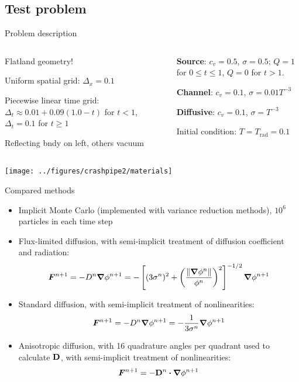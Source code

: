 \documentclass{beamer}
\newcommand{\Dtens}{\mat{D}}
\begin{document}
\subsection{Test problem}
\begin{frame}{Problem description}
  \begin{columns}[t]
    \begin{column}{.48\textwidth}
      Flatland geometry!

      Uniform spatial grid: $\Delta_x=0.1$
      
      Piecewise linear time grid: $\Delta_t \approx 0.01 + 0.09 (1.0 - t)$ for
      $t < 1$, $\Delta_t=0.1$ for $t \ge 1$

      Reflecting bndy on left, others vacuum
    \end{column}
    \begin{column}{.48\textwidth}
      \textcolor[rgb]{0,0,1}{\textbf{Source}}: $c_v=0.5$, $\sigma=0.5$;
      $Q=1$ for $0 \le t \le 1$, $Q=0$ for $t > 1$.

      \textcolor[rgb]{0.1,0.9,0.1}{\textbf{Channel}}: $c_v=0.1$,
      $\sigma=0.01 T^{-3}$

      \textcolor[rgb]{1,0,0}{\textbf{Diffusive}}: $c_v=0.1$,
      $\sigma=T^{-3}$

      Initial condition: $T=T_\text{rad}=0.1$
    \end{column}
  \end{columns}
\begin{center}
  \texttt{[image: ../figures/crashpipe2/materials]}
\end{center}
\end{frame}
\begin{frame}{Compared methods}
\begin{itemize}
  \item Implicit Monte Carlo \cite{Fle1971} (implemented with variance
    reduction methods), $10^6$ particles in each time step
  \item Flux-limited diffusion, with semi-implicit treatment of diffusion
    coefficient and radiation:
    \begin{equation*}
      \bm{F}^{n+1} = - D^{n} \bm{\nabla} \phi^{n+1}  = -\left[ (3\sigma^{n})^2
      + \left( \frac{\left\| \bm{\nabla} \phi^{n} \right\|}{\phi^{n}}  \right)^2 \right]^{-1/2}
      \bm{\nabla} \phi^{n+1}
    \end{equation*}
  \item Standard diffusion, with semi-implicit treatment of nonlinearities:
    \begin{equation*}
      \bm{F}^{n+1} = - D^{n} \bm{\nabla} \phi^{n+1} 
      = -\frac{1}{3\sigma^{n}} \bm{\nabla} \phi^{n+1}
    \end{equation*}
  \item Anisotropic diffusion, with 16 \SN{} quadrature angles per quadrant used
    to calculate $\Dtens$, with semi-implicit treatment of nonlinearities:
    \begin{equation*}
      \vec{F}^{n+1} = -\Dtens^{n}\vd \del \phi^{n+1} 
    \end{equation*}
\end{itemize}
\end{frame}
\end{document}
